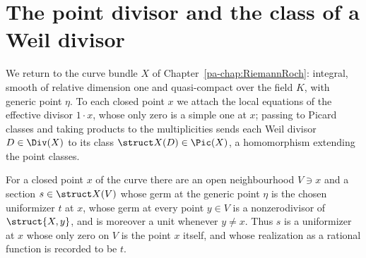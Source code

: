 \section{The point divisor and the class of a Weil divisor}

We return to the curve bundle \(X\) of Chapter~\ref{pa-chap:RiemannRoch}: integral, smooth of relative
dimension one and quasi-compact over the field \(K\), with generic point \(\eta\). To each closed
point \(x\) we attach the local equations of the effective divisor \(1 \cdot x\), whose only zero
is a simple one at \(x\); passing to Picard classes and taking products to the multiplicities sends
each Weil divisor \(D \in \Div(X)\) to its class \(\struct X(D) \in \Pic(X)\), a homomorphism
extending the point classes.

\begin{lemma}
  \label{pa-lem:exists_pointLocalEquation}
  \leanok

  For a closed point \(x\) of the curve there are an open neighbourhood \(V \ni x\) and a section
  \(s \in \struct X(V)\) whose germ at the generic point \(\eta\) is the chosen uniformizer \(t\) at
  \(x\), whose germ at every point \(y \in V\) is a nonzerodivisor of \(\struct{X,y}\), and is
  moreover a unit whenever \(y \neq x\). Thus \(s\) is a uniformizer at \(x\) whose only zero on
  \(V\) is the point \(x\) itself, and whose realization as a rational function is recorded to be
  \(t\).
\end{lemma}
